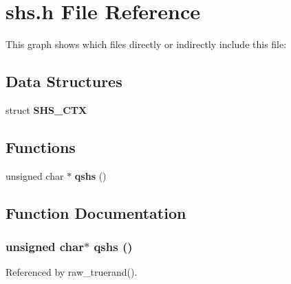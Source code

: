 \section{shs.h File Reference}
\label{shs_8h}




This graph shows which files directly or indirectly include this file:\subsection*{Data Structures}
\begin{CompactItemize}
\item 
struct {\bf SHS\_\-CTX}
\end{CompactItemize}
\subsection*{Functions}
\begin{CompactItemize}
\item 
unsigned char $\ast$ {\bf qshs} ()
\end{CompactItemize}


\subsection{Function Documentation}
\subsubsection{\setlength{\rightskip}{0pt plus 5cm}unsigned char$\ast$ qshs ()}\label{shs_8h_a0}




Referenced by raw\_\-truerand().